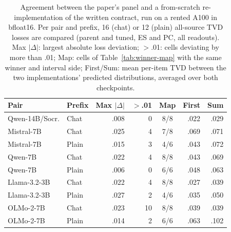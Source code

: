 \begin{table}[H]
\centering\scriptsize
\setlength{\tabcolsep}{2.6pt}
\begin{tabular}{@{}llrrcrr@{}}
\toprule
Pair & Prefix & Max $|\Delta|$ & $>$.01 & Map & First & Sum \\
\midrule
Qwen-14B/Socr. & Chat & .008 & 0 & 8/8 & .022 & .029 \\
Mistral-7B & Chat & .025 & 4 & 7/8 & .069 & .071 \\
Mistral-7B & Plain & .015 & 3 & 4/6 & .043 & .072 \\
Qwen-7B & Chat & .022 & 4 & 8/8 & .043 & .069 \\
Qwen-7B & Plain & .006 & 0 & 6/6 & .048 & .063 \\
Llama-3.2-3B & Chat & .022 & 4 & 8/8 & .027 & .039 \\
Llama-3.2-3B & Plain & .027 & 2 & 4/6 & .035 & .050 \\
OLMo-2-7B & Chat & .023 & 10 & 8/8 & .039 & .039 \\
OLMo-2-7B & Plain & .014 & 2 & 6/6 & .063 & .102 \\
\bottomrule
\end{tabular}
\caption{Agreement between the paper's panel and a from-scratch re-implementation of the written contract, run on a rented A100 in bfloat16. Per pair and prefix, 16 (chat) or 12 (plain) all-source TVD losses are compared (parent and tuned, ES and PC, all readouts). Max $|\Delta|$: largest absolute loss deviation; $>$.01: cells deviating by more than .01; Map: cells of Table~\ref{tab:winner-map} with the same winner and interval side; First/Sum: mean per-item TVD between the two implementations' predicted distributions, averaged over both checkpoints.}
\label{tab:reimplementation}
\end{table}
